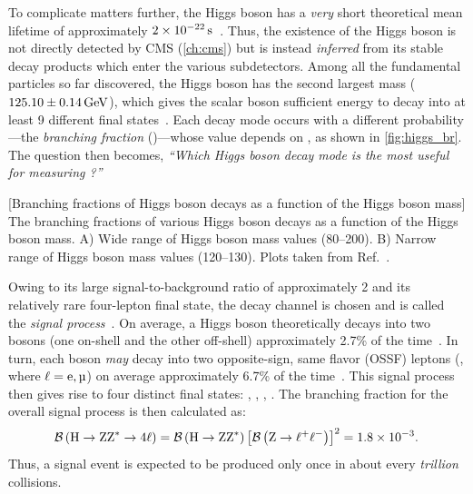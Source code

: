To complicate matters further, the Higgs boson has a \emph{very} short theoretical mean lifetime of approximately $2 \times \text{10}^\text{$-$22}\,\text{s}$~\cite{CMS-PAS-HIG-21-013}.
Thus, the existence of the Higgs boson is not directly detected by CMS (\cref{ch:cms}) but is instead \emph{inferred} from its stable decay products which enter the various subdetectors.
Among all the fundamental particles so far discovered, the Higgs boson has the second largest mass ($125.10 \pm 0.14\,\text{Ge\hspace{-.08em}V}$), which gives the scalar boson sufficient energy to decay into at least 9 different final states~\cite{particle_data_group_review_2020}.
Each decay mode occurs with a different probability---the \emph{branching fraction} (\br)---whose value depends on \mH, as shown in \cref{fig:higgs_br}.
The question then becomes, \emph{``Which Higgs boson decay mode is the most useful for measuring \mH?''}
\begin{multiFigure}
	\centering
		[Branching fractions of Higgs boson decays as a function of the Higgs boson mass]
		{The branching fractions of various Higgs boson decays as a function of the Higgs boson mass.
		\;A) Wide range of Higgs boson mass values (80--200\GeV).
		\;B) Narrow range of Higgs boson mass values (120--130\GeV).
		Plots taken from Ref.~\cite{particle_data_group_review_2020}.}
	\label{fig:higgs_br}
\end{multiFigure} 

Owing to its large signal-to-background ratio of approximately 2 and its relatively rare four-lepton final state, the \hzzfourl decay channel is chosen and is called the \emph{signal process}~\cite{HIG_19_001}.
On average, a Higgs boson theoretically decays into two \PZ bosons (one on-shell and the other off-shell) approximately 2.7\% of the time~\cite{ATLAS:2022vkf}.
In turn, each \PZ boson \emph{may} decay into two opposite-sign, same flavor (OSSF) leptons (\ztolplm, where $\ell = \Pe, \Pmu$) on average approximately 6.7\% of the time~\cite{particle_data_group_review_2020}.
This signal process then gives rise to four distinct final states: \foure, \fourmu, \twoetwomu, \twomutwoe.
The branching fraction for the overall signal process is then calculated as: %
\begin{equation*}
    \mathcal{B} \left( \mathrm{H} \to \text{Z}\text{Z}^{\ast} \to 4\ell \right) = \mathcal{B} \left( \mathrm{H} \to \text{Z}\text{Z}^{\ast} \right) \left[ \mathcal{B} \left( \text{Z} \to \ell^+ \ell^- \right) \right]^2 = 1.8 \times \text{10}^\text{$-$3}.
\end{equation*}
Thus, a signal event is expected to be produced only once in about every \emph{trillion} \pp collisions.

